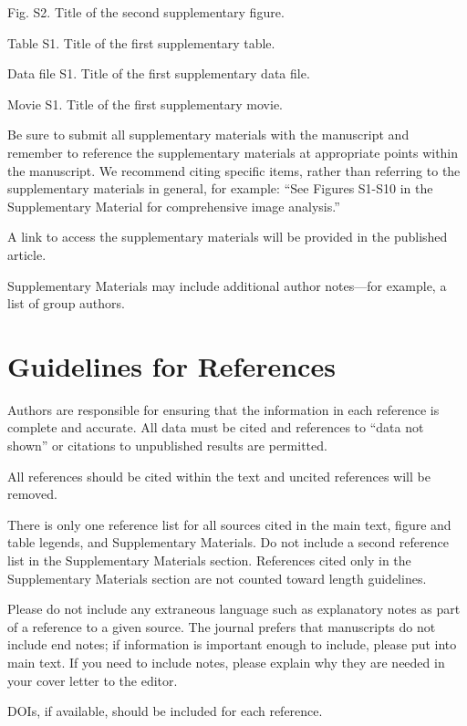\documentclass{article}
\begin{document}
Fig. S2. Title of the second supplementary figure.

Table S1. Title of the first supplementary table.

Data file S1. Title of the first supplementary data file.

Movie S1. Title of the first supplementary movie.

\medskip
Be sure to submit all supplementary materials with the manuscript and remember to reference the supplementary materials at appropriate points within the manuscript. We recommend citing specific items, rather than referring to the supplementary materials in general, for example: ``See Figures S1-S10 in the Supplementary Material for comprehensive image analysis.''

A link to access the supplementary materials will be provided in the published article.

Supplementary Materials may include additional author notes—for example, a list of group authors.

\section*{Guidelines for References}
Authors are responsible for ensuring that the information in each reference is complete and accurate. All data must be cited and references to ``data not shown'' or citations to unpublished results are permitted.

All references should be cited within the text and uncited references will be removed.

There is only one reference list for all sources cited in the main text, figure and table legends, and Supplementary Materials. Do not include a second reference list in the Supplementary Materials section. References cited only in the Supplementary Materials section are not counted toward length guidelines.

Please do not include any extraneous language such as explanatory notes as part of a reference to a given source. The journal prefers that manuscripts do not include end notes; if information is important enough to include, please put into main text.  If you need to include notes, please explain why they are needed in your cover letter to the editor.

DOIs, if available, should be included for each reference.

\printbibliography
\end{document}
